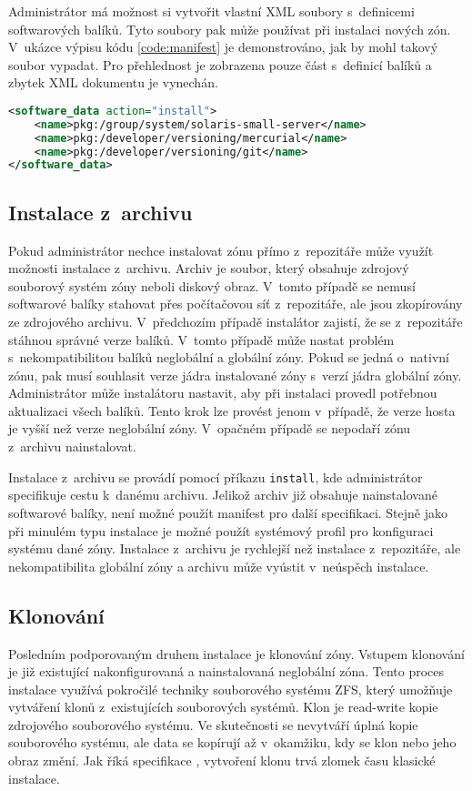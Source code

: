 Administrátor má možnost si vytvořit vlastní XML soubory s~definicemi softwarových balíků. Tyto soubory pak může používat
při instalaci nových zón. V~ukázce výpisu kódu \ref{code:manifest} je demonstrováno, jak by mohl takový soubor vypadat.
Pro přehlednost je zobrazena pouze část s~definicí balíků a zbytek XML dokumentu je vynechán.
\begin{lstlisting}[language={XML}, caption={Ukázkový manifest}, label={code:manifest}]
<software_data action="install">    
    <name>pkg:/group/system/solaris-small-server</name>
    <name>pkg:/developer/versioning/mercurial</name>
    <name>pkg:/developer/versioning/git</name>    
</software_data>
\end{lstlisting}
\subsection{Instalace z~archivu}
\label{chapter:zones:instalation:archive}
Pokud administrátor nechce instalovat zónu přímo z~repozitáře může využít možnosti instalace z~archivu. Archiv je soubor, který obsahuje
zdrojový souborový systém zóny neboli diskový obraz. V~tomto případě se nemusí softwarové balíky stahovat přes počítačovou síť z~repozitáře,
ale jsou zkopírovány ze zdrojového archivu. V~předchozím případě instalátor zajistí, že se z~repozitáře stáhnou správné verze
balíků. V~tomto případě může nastat problém s~nekompatibilitou balíků neglobální a 
globální zóny. Pokud se jedná o~nativní zónu, pak musí souhlasit verze jádra instalované zóny s~verzí jádra globální zóny. 
Administrátor může instalátoru nastavit, aby při instalaci provedl potřebnou aktualizaci všech balíků. Tento krok lze provést
jenom v~případě, že verze hosta je vyšší než verze neglobální zóny. V~opačném případě se nepodaří zónu z~archivu nainstalovat.

Instalace z~archivu se provádí pomocí příkazu \verb|install|, kde administrátor specifikuje
cestu k~danému archivu. Jelikož archiv již obsahuje nainstalované softwarové balíky, není možné použít manifest pro další specifikaci.
Stejně jako při minulém typu instalace je možné použít systémový profil pro konfiguraci systému dané zóny. Instalace
z~archivu je rychlejší než instalace z~repozitáře, ale nekompatibilita globální zóny a archivu může vyústit v~neúspěch instalace.
\subsection{Klonování}
\label{chapter:zones:instalation:cloning}
Posledním podporovaným druhem instalace je klonování zóny. Vstupem klonování je již existující nakonfigurovaná a nainstalovaná
neglobální zóna. Tento proces instalace využívá pokročilé techniky souborového systému ZFS, který umožňuje vytváření klonů z~existujících
souborových systémů. Klon je read-write kopie zdrojového souborového systému. Ve skutečnosti se nevytváří úplná kopie
souborového systému, ale data se kopírují až v~okamžiku, kdy se klon nebo jeho obraz změní. Jak říká specifikace \cite{oracle:solaris:zones:clonning},
vytvoření klonu trvá zlomek času klasické instalace. 

